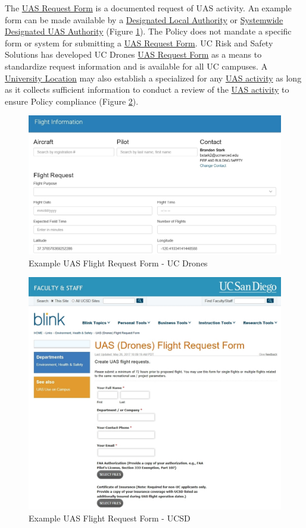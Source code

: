 \documentclass[
]{book}
\begin{document}
The \protect\hyperlink{FR}{UAS Request Form} is a documented request of UAS activity. An example form can be made available by a \protect\hyperlink{DLA}{Designated Local Authority} or \protect\hyperlink{SDA}{Systemwide Designated UAS Authority} (Figure \ref{fig:nice-fig2}). The Policy does not mandate a specific form or system for submitting a \protect\hyperlink{FR}{UAS Request Form}. UC Risk and Safety Solutions has developed UC Drones \protect\hyperlink{FR}{UAS Request Form} as a means to standardize request information and is available for all UC campuses. A \protect\hyperlink{UL}{University Location} may also establish a specialized for any \protect\hyperlink{UASactivity}{UAS activity} as long as it collects sufficient information to conduct a review of the \protect\hyperlink{UASactivity}{UAS activity} to ensure Policy compliance (Figure \ref{fig:flight-request-ucsd}).

\begin{figure}

{\centering \includegraphics[width=0.5\linewidth]{images/flight_request1} 

}

\caption{Example UAS Flight Request Form - UC Drones}\label{fig:nice-fig2}
\end{figure}

\begin{figure}

{\centering \includegraphics[width=0.5\linewidth]{images/flight_request2} 

}

\caption{Example UAS Flight Request Form - UCSD}\label{fig:flight-request-ucsd}
\end{figure}
\end{document}
